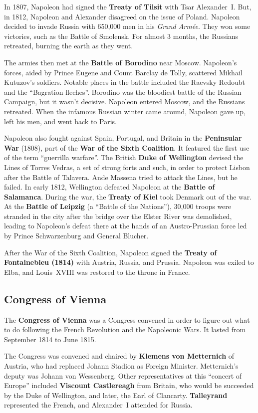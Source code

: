 In 1807, Napoleon had signed the \textbf{Treaty of Tilsit} with Tsar Alexander~I.
But, in 1812, Napoleon and Alexander disagreed on the issue of Poland.
Napoleon decided to invade Russia with 650,000 men in his \textit{Grand Arm\'ee}.
They won some victories, such as the Battle of Smolensk.
For almost 3 months, the Russians retreated, burning the earth as they went.

The armies then met at the \textbf{Battle of Borodino} near Moscow.
Napoleon's forces, aided by Prince Eugene and Count Barclay de Tolly, scattered Mikhail Kutuzov's soldiers.
Notable places in the battle included the Raevsky Redoubt and the ``Bagration fleches''.
Borodino was the bloodiest battle of the Russian Campaign, but it wasn't decisive.
Napoleon entered Moscow, and the Russians retreated.
When the infamous Russian winter came around, Napoleon gave up, left his men, and went back to Paris.

Napoleon also fought against Spain, Portugal, and Britain in the \textbf{Peninsular War} (1808),
part of the \textbf{War of the Sixth Coalition}.
It featured the first use of the term ``guerrilla warfare''.
The British \textbf{Duke of Wellington} devised the Lines of Torres Vedras, a set of strong forts and such,
in order to protect Lisbon after the Battle of Talavera.
Ande Massena tried to attack the Lines, but he failed.
In early 1812, Wellington defeated Napoleon at the \textbf{Battle of Salamanca}.
During the war, the \textbf{Treaty of Kiel} took Denmark out of the war.
At the \textbf{Battle of Leipzig} (a ``Battle of the Nations''),
30,000 troops were stranded in the city after the bridge over the Elster River was demolished,
leading to Napoleon's defeat there at the hands of an Austro-Prussian force
led by Prince Schwarzenburg and General Blucher.

After the War of the Sixth Coalition,
Napoleon signed the \textbf{Treaty of Fontainebleu (1814)} with Austria, Russia, and Prussia.
Napoleon was exiled to Elba, and Louis~XVIII was restored to the throne in France.

\subsection*{Congress of Vienna}

The \textbf{Congress of Vienna} was a Congress convened in order to figure out what to do
following the French Revolution and the Napoleonic Wars.
It lasted from September 1814 to June 1815.

The Congress was convened and chaired by \textbf{Klemens von Metternich} of Austria,
who had replaced Johann Stadion as Foreign Minister.
Metternich's deputy was Johann von Wessenberg.
Other representatives at this ``concert of Europe'' included
\textbf{Viscount Castlereagh} from Britain, who would be succeeded by the Duke of Wellington,
and later, the Earl of Clancarty.
\textbf{Talleyrand} represented the French, and Alexander~I attended for Russia.

